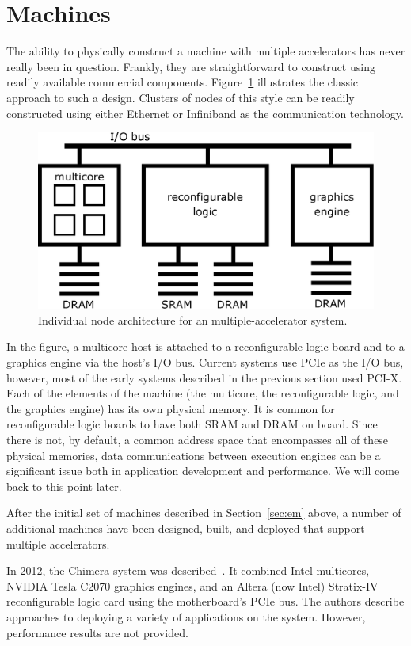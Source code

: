 \section{Machines}
\label{sec:machines}

The ability to physically construct a machine with multiple accelerators
has never really been in question.  Frankly, they are straightforward to
construct using readily available commercial components.
Figure~\ref{fig:nodearch} illustrates the classic approach to such a design.
Clusters of nodes of this style can be readily constructed using either
Ethernet or Infiniband as the communication technology.

\begin{figure}[ht]
\centering
\includegraphics[width=0.75\linewidth]{nodearch}
\caption{Individual node architecture for an multiple-accelerator system.}
\label{fig:nodearch}
\end{figure}

In the figure, a multicore host is attached to a reconfigurable logic board
and to a graphics engine via the host's I/O bus.  Current systems use
PCIe as the I/O bus, however, most of the early systems described in
the previous section used PCI-X.
Each of the elements of the machine (the multicore, the reconfigurable
logic, and the graphics engine) has its own physical memory.  It is common
for reconfigurable logic boards to have both SRAM and DRAM on board.
Since there is not, by default, a common address space that encompasses
all of these physical memories, data communications between execution
engines can be a significant issue both in application development and
performance.  We will come back to this point later.

After the initial set of machines described in Section~\ref{sec:em} above,
a number of additional machines have been designed, built, and deployed
that support multiple accelerators.

In 2012, the Chimera system was described~\cite{ibs12}.
It combined Intel multicores, NVIDIA Tesla C2070 graphics engines,
and an Altera (now Intel) Stratix-IV reconfigurable logic card using
the motherboard's PCIe bus. The authors describe approaches to deploying
a variety of applications on the system. However, performance results
are not provided.

